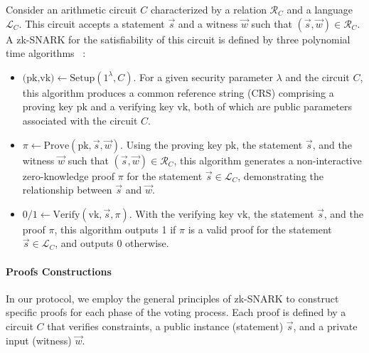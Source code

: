 \documentclass[runningheads]{llncs}
\begin{document}
Consider an arithmetic circuit $C$ characterized by a relation $\mathcal{R}_C$ and a language $\mathcal{L}_C$. This circuit accepts a statement $\vec{s}$ and a witness $\vec{w}$ such that $(\vec{s}, \vec{w}) \in \mathcal{R}_C$. A zk-SNARK for the satisfiability of this circuit is defined by three polynomial time algorithms ~\cite{grothSizePairingbasedNoninteractive2016,parnoPinocchioNearlyPractical2013}:

\begin{itemize}
    \item $\textrm{(pk,vk)} \gets \textrm{Setup}(1^\lambda,C)$. For a given security parameter $\lambda$ and the circuit $C$, this algorithm produces a common reference string (CRS) comprising a proving key $\textrm{pk}$ and a verifying key $\textrm{vk}$, both of which are public parameters associated with the circuit $C$.
    \item $\pi \gets \textrm{Prove}(\textrm{pk}, \vec{s}, \vec{w})$. Using the proving key $\textrm{pk}$, the statement $\vec{s}$, and the witness $\vec{w}$ such that $(\vec{s}, \vec{w}) \in \mathcal{R}_C$, this algorithm generates a non-interactive zero-knowledge proof $\pi$ for the statement $\vec{s} \in \mathcal{L}_C$, demonstrating the relationship between $\vec{s}$ and $\vec{w}$.
    \item $0/1 \gets \textrm{Verify}(\textrm{vk}, \vec{s}, \pi)$. With the verifying key $\textrm{vk}$, the statement $\vec{s}$, and the proof $\pi$, this algorithm outputs 1 if $\pi$ is a valid proof for the statement $\vec{s} \in \mathcal{L}_C$, and outputs 0 otherwise.
\end{itemize}


\paragraph{Proofs Constructions}\label{sec:proofs}

In our protocol, we employ the general principles of zk-SNARK to construct specific proofs for each phase of the voting process. Each proof is defined by a circuit $C$ that verifies constraints, a public instance (statement) $\vec{s}$, and a private input (witness) $\vec{w}$.

\subsection{}\label{sec:proof-fdkg}
\end{document}
